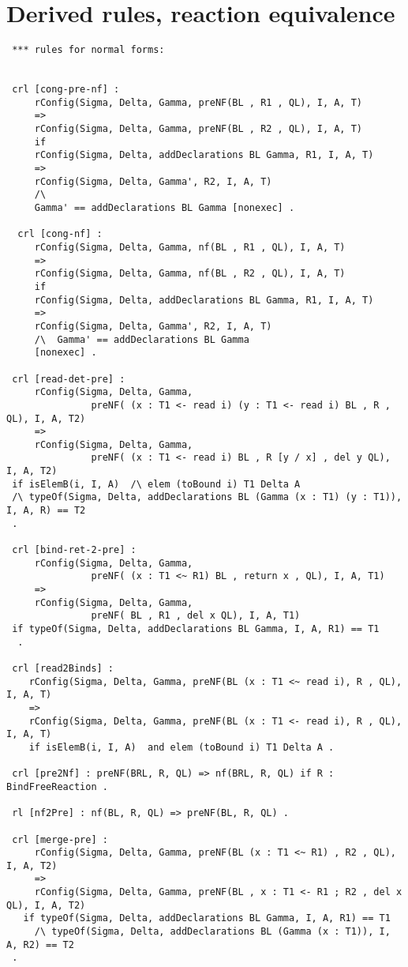 \section{Derived rules, reaction equivalence}

\begin{lstlisting}
 *** rules for normal forms: 
 
 
 crl [cong-pre-nf] :
     rConfig(Sigma, Delta, Gamma, preNF(BL , R1 , QL), I, A, T)
     => 
     rConfig(Sigma, Delta, Gamma, preNF(BL , R2 , QL), I, A, T)
     if 
     rConfig(Sigma, Delta, addDeclarations BL Gamma, R1, I, A, T) 
     => 
     rConfig(Sigma, Delta, Gamma', R2, I, A, T) 
     /\
     Gamma' == addDeclarations BL Gamma [nonexec] .
     
  crl [cong-nf] :
     rConfig(Sigma, Delta, Gamma, nf(BL , R1 , QL), I, A, T)
     => 
     rConfig(Sigma, Delta, Gamma, nf(BL , R2 , QL), I, A, T)
     if 
     rConfig(Sigma, Delta, addDeclarations BL Gamma, R1, I, A, T) 
     => 
     rConfig(Sigma, Delta, Gamma', R2, I, A, T) 
     /\  Gamma' == addDeclarations BL Gamma 
     [nonexec] . 
     
 crl [read-det-pre] :
     rConfig(Sigma, Delta, Gamma, 
               preNF( (x : T1 <- read i) (y : T1 <- read i) BL , R , QL), I, A, T2) 
     =>
     rConfig(Sigma, Delta, Gamma, 
               preNF( (x : T1 <- read i) BL , R [y / x] , del y QL), I, A, T2) 
 if isElemB(i, I, A)  /\ elem (toBound i) T1 Delta A
 /\ typeOf(Sigma, Delta, addDeclarations BL (Gamma (x : T1) (y : T1)), I, A, R) == T2        
 .
                
 crl [bind-ret-2-pre] : 
     rConfig(Sigma, Delta, Gamma, 
               preNF( (x : T1 <~ R1) BL , return x , QL), I, A, T1) 
     =>
     rConfig(Sigma, Delta, Gamma, 
               preNF( BL , R1 , del x QL), I, A, T1) 
 if typeOf(Sigma, Delta, addDeclarations BL Gamma, I, A, R1) == T1 
  .         
     
 crl [read2Binds] : 
    rConfig(Sigma, Delta, Gamma, preNF(BL (x : T1 <~ read i), R , QL), I, A, T) 
    =>
    rConfig(Sigma, Delta, Gamma, preNF(BL (x : T1 <- read i), R , QL), I, A, T) 
    if isElemB(i, I, A)  and elem (toBound i) T1 Delta A .
    
 crl [pre2Nf] : preNF(BRL, R, QL) => nf(BRL, R, QL) if R : BindFreeReaction .
 
 rl [nf2Pre] : nf(BL, R, QL) => preNF(BL, R, QL) .
      
 crl [merge-pre] :
     rConfig(Sigma, Delta, Gamma, preNF(BL (x : T1 <~ R1) , R2 , QL), I, A, T2)
     =>
     rConfig(Sigma, Delta, Gamma, preNF(BL , x : T1 <- R1 ; R2 , del x QL), I, A, T2) 
   if typeOf(Sigma, Delta, addDeclarations BL Gamma, I, A, R1) == T1
     /\ typeOf(Sigma, Delta, addDeclarations BL (Gamma (x : T1)), I, A, R2) == T2
 .
    

\end{lstlisting}
